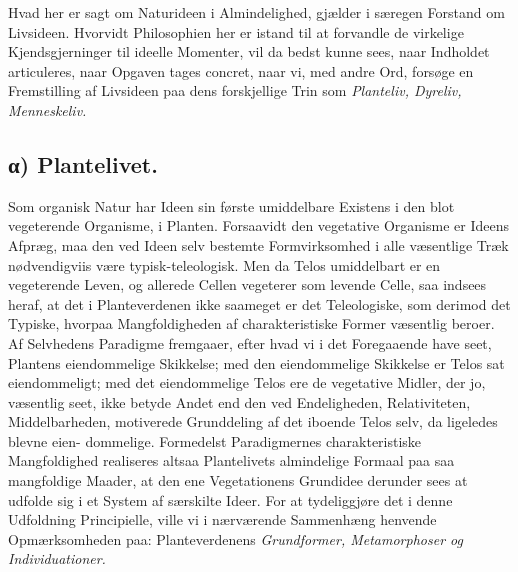 \documentclass[12pt,a4paper]{book}
\begin{document}
Hvad her er sagt om Naturideen i Almindelighed, gjælder i særegen
Forstand om Livsideen. Hvorvidt Philosophien her er istand til at
forvandle de virkelige Kjendsgjerninger til ideelle Momenter, vil da
bedst kunne sees, naar Indholdet articuleres, naar Opgaven tages
concret, naar vi, med andre Ord, forsøge en Fremstilling af Livsideen
paa dens forskjellige Trin som \emph{Planteliv, Dyreliv, Menneskeliv.}

\subsection*{α) Plantelivet.}

Som organisk Natur har Ideen sin første umiddelbare Existens i den blot
vegeterende Organisme, i Planten. Forsaavidt den vegetative Organisme er
Ideens Afpræg, maa den ved Ideen selv bestemte Formvirksomhed i alle
væsentlige Træk nødvendigviis være typisk-teleologisk. Men da Telos
umiddelbart er en vegeterende Leven, og allerede Cellen vegeterer som
levende Celle, saa indsees heraf, at det i Planteverdenen ikke saameget
er det Teleologiske, som derimod det Typiske, hvorpaa Mangfoldigheden af
charakteristiske Former væsentlig beroer. Af Selvhedens Paradigme
fremgaaer, efter hvad vi i det Foregaaende have seet, Plantens
eiendommelige Skikkelse; med den eiendommelige Skikkelse er Telos sat
eiendommeligt; med det eiendommelige Telos ere de vegetative Midler, der
jo, væsentlig seet, ikke betyde Andet end den ved Endeligheden,
Relativiteten, Middelbarheden, motiverede Grunddeling af det iboende
Telos selv, da ligeledes blevne eien-
\setcounter{footnote}{0}
dommelige. Formedelst Paradigmernes charakteristiske Mangfoldighed
realiseres altsaa Plantelivets almindelige Formaal paa saa mangfoldige
Maader, at den ene Vegetationens Grundidee derunder sees at udfolde sig
i et System af særskilte Ideer. For at tydeliggjøre det i denne
Udfoldning Principielle, ville vi i nærværende Sammenhæng henvende
Opmærksomheden paa: Planteverdenens \emph{Grundformer, Metamorphoser og
Individuationer.}
\end{document}
